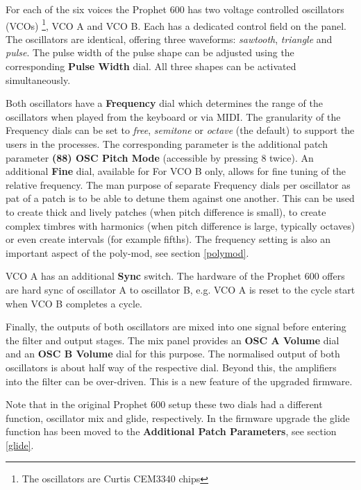 For each of the six voices the Prophet 600 has two voltage controlled oscillators (VCOs) \footnote{The oscillators are Curtis CEM3340 chips}, VCO A and VCO B. Each has a dedicated control field on the panel. The oscillators are identical, offering three waveforms: \textit{sawtooth}, \textit{triangle} and \textit{pulse}. The pulse width of the pulse shape can be adjusted using the corresponding \textbf{Pulse Width} dial. All three shapes can be activated simultaneously. 

Both oscillators have a \textbf{Frequency} dial which determines the range of the oscillators when played from the keyboard or via MIDI.  The granularity of the Frequency dials can be set to \textit{free}, \textit{semitone} or \textit{octave} (the default) to support the users in the processes. The corresponding parameter is the additional patch parameter \textbf{(88) OSC Pitch Mode} (accessible by pressing 8 twice). An additional \textbf{Fine} dial, available for For VCO B only,  allows for fine tuning of the relative frequency. The man purpose of separate Frequency dials per oscillator as pat of a patch is to be able to detune them against one another. This can be used to create thick and lively patches (when pitch difference is small), to create complex timbres with harmonics (when pitch difference is large, typically octaves) or even create intervals (for example fifths). The frequency setting is also an important aspect of the poly-mod, see section \ref{polymod}. 

VCO A has an additional \textbf{Sync} switch. The hardware of the Prophet 600 offers are hard sync of oscillator A to oscillator B, e.g. VCO A is reset to the cycle start when VCO B completes a cycle. 

Finally, the outputs of both oscillators are mixed into one signal before entering the filter and output stages. The mix panel provides an \textbf{OSC A Volume} dial and an \textbf{OSC B Volume} dial for this purpose. The normalised output of both oscillators is about half way of the respective dial. Beyond this, the amplifiers into the filter can be over-driven. This is a new feature of the upgraded firmware.

Note that in the original Prophet 600 setup these two dials had a different function, oscillator mix and glide, respectively. In the firmware upgrade the glide function has been moved to the \textbf{Additional Patch Parameters}, see section \ref{glide}. 
